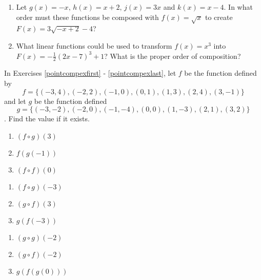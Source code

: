 \begin{enumerate}
\setcounter{enumi}{\value{HW}}


\item Let $g(x) = -x, \, h(x) = x + 2, \, j(x) = 3x$ and $k(x) = x - 4$.  In what order must these functions be composed with $f(x) = \sqrt{x}$ to create $F(x) = 3\sqrt{-x + 2} - 4$?

\item What linear functions could be used to transform $f(x) = x^{3}$ into $F(x) = -\frac{1}{2}(2x - 7)^{3} + 1$?  What is the proper order of composition?

\setcounter{HW}{\value{enumi}}
\end{enumerate}

\newpage

In Exercises \ref{pointcompexfirst} - \ref{pointcompexlast}, let $f$ be the function defined by \[f = \{(-3, 4), (-2, 2), (-1, 0), (0, 1), (1, 3), (2, 4), (3, -1)\}\] and let $g$ be the function defined \[g = \{(-3, -2), (-2, 0), (-1, -4), (0, 0), (1, -3), (2, 1), (3, 2)\}\].  Find the value if it exists.

\begin{multicols}{3}
\begin{enumerate}
\setcounter{enumi}{\value{HW}}

\item $(f \circ g)(3)$ \label{pointcompexfirst}
\item $f(g(-1))$
\item $(f \circ f)(0)$

\setcounter{HW}{\value{enumi}}
\end{enumerate}
\end{multicols}

\begin{multicols}{3}
\begin{enumerate}
\setcounter{enumi}{\value{HW}}


\item $(f \circ g)(-3)$
\item $(g \circ f)(3)$
\item $g(f(-3))$


\setcounter{HW}{\value{enumi}}
\end{enumerate}
\end{multicols}

\begin{multicols}{3}
\begin{enumerate}
\setcounter{enumi}{\value{HW}}

\item $(g \circ g)(-2)$
\item $(g \circ f)(-2)$
\item $g(f(g(0)))$ \label{pointcompexlast}


\setcounter{HW}{\value{enumi}}
\end{enumerate}
\end{multicols}

